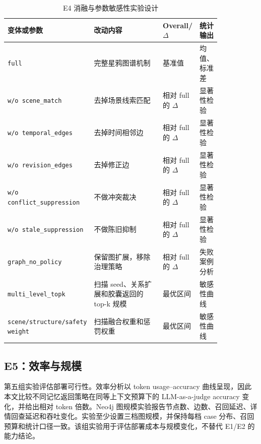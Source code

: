 \documentclass[a4paper,fleqn]{cas-sc}
\begin{document}
\begin{CJK*}{UTF8}{gbsn}
\begin{table}[t]
\centering
\scriptsize
\caption{E4 消融与参数敏感性实验设计}
\label{tab:e4-ablation}
\setlength{\tabcolsep}{3pt}
\begin{tabular}{P{0.26\linewidth}P{0.34\linewidth}P{0.14\linewidth}P{0.10\linewidth}}
\toprule
变体或参数 & 改动内容 & Overall/$\Delta$ & 统计输出 \\
\midrule
\texttt{full} & 完整星鸦图谱机制 & 基准值 & 均值、标准差 \\
\texttt{w/o scene\_match} & 去掉场景线索匹配 & 相对 full 的 $\Delta$ & 显著性检验 \\
\texttt{w/o temporal\_edges} & 去掉时间相邻边 & 相对 full 的 $\Delta$ & 显著性检验 \\
\texttt{w/o revision\_edges} & 去掉修正边 & 相对 full 的 $\Delta$ & 显著性检验 \\
\texttt{w/o conflict\_suppression} & 不做冲突裁决 & 相对 full 的 $\Delta$ & 显著性检验 \\
\texttt{w/o stale\_suppression} & 不做陈旧抑制 & 相对 full 的 $\Delta$ & 显著性检验 \\
\texttt{graph\_no\_policy} & 保留图扩展，移除治理策略 & 相对 full 的 $\Delta$ & 失败案例分析 \\
\texttt{multi\_level\_topk} & 扫描 seed、关系扩展和胶囊返回的 top-k 规模 & 最优区间 & 敏感性曲线 \\
\texttt{scene/structure/safety weight} & 扫描融合权重和惩罚权重 & 最优区间 & 敏感性曲线 \\
\bottomrule
\end{tabular}
\end{table}

\subsection{E5：效率与规模}

第五组实验评估部署可行性。效率分析以 token usage--accuracy 曲线呈现，因此本文比较不同记忆返回策略在同等上下文预算下的 LLM-as-a-judge accuracy 变化，并给出相对 token 倍数。Neo4j 图规模实验报告节点数、边数、召回延迟、详情回查延迟和吞吐变化。实验至少设置三档图规模，并保持每档 case 分布、召回预算和统计口径一致。该组实验用于评估部署成本与规模变化，不替代 E1/E2 的能力结论。


\end{CJK*}
\end{document}
